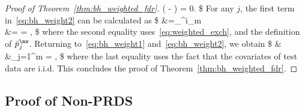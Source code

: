 \begin{proof}[Proof of Theorem~\ref{thm:bh_weighted_fdr}]
\Big(   -  \Big) = 0.
\$
For any $j$,
the first term in~\eqref{eq:bh_weight2} can be calculated as
\$
\EE{}
&=\sum_{}^{i_m }  \\
&=  = ,
\$
where the second equality uses~\eqref{eq:weighted_exch},
and the definition of $\bar{p}_j^\nw$.
Returning to~\eqref{eq:bh_weight1} and~\eqref{eq:bh_weight2}, we obtain
\$
&\EE\Bigg[  \frac{\sum_{j=1}^m  \ind\{j\in \cR_{\nw},Y_{n+j}\leq c_{n+j}\}/w(X_{n+j})  }{1\vee |\cR^\nw| }   \Bigg] \\
&\leq {}\sum_{j=1}^m  \EE{}
= \EE\bigg[ \frac{(n+1)q }{\sum_{i=1}^n w(X_i) + w(X_{n+1})}\bigg],
\$
where the last equality uses the fact that
the covariates of test data are i.i.d. This concludes the proof of Theorem~\ref{thm:bh_weighted_fdr}.
\end{proof}


\subsection{Proof of Non-PRDS}
\label{app:subsec_prds}

